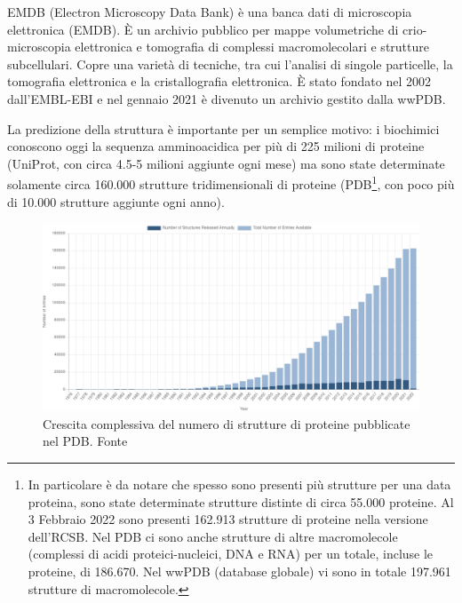 \par EMDB (Electron Microscopy Data Bank) è una banca dati di microscopia elettronica (EMDB). È un archivio pubblico per mappe volumetriche di crio-microscopia elettronica e tomografia di complessi macromolecolari e strutture subcellulari. Copre una varietà di tecniche, tra cui l'analisi di singole particelle, la tomografia elettronica e la cristallografia elettronica. È stato fondato nel 2002 dall'EMBL-EBI e nel gennaio 2021 è divenuto un archivio gestito dalla wwPDB. \\

\par La predizione della struttura è importante per un semplice motivo: i biochimici conoscono oggi la sequenza amminoacidica per più di 225 milioni di proteine\supercite{proteienDBentries} (UniProt, con circa 4.5-5 milioni aggiunte ogni mese) ma sono state determinate solamente circa 160.000 strutture tridimensionali di proteine\supercite{proteienDBentries} (PDB\footnote{In particolare è da notare che spesso sono presenti più strutture per una data proteina, sono state determinate strutture distinte di circa 55.000 proteine. Al 3 Febbraio 2022 sono presenti 162.913 strutture di proteine nella versione dell'RCSB. Nel PDB ci sono anche strutture di altre macromolecole (complessi di acidi proteici-nucleici, DNA e RNA) per un totale, incluse le proteine, di 186.670\supercite{pdbStats}. Nel wwPDB (database globale) vi sono in totale 197.961 strutture di macromolecole\supercite{wwpdbStats}.}, con poco più di 10.000 strutture aggiunte ogni anno). 

\begin{figure}[!htb]
	\centering
	\includegraphics[scale=0.3]{images/pdb-statistica.png}
	\caption{Crescita complessiva del numero di strutture di proteine pubblicate nel PDB. Fonte\cite{pdbStats}}
	\label{fig:pdb-statistica}
\end{figure}


